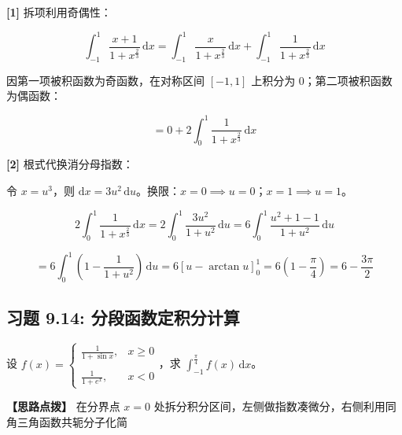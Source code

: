 \documentclass[11pt,a4paper,UTF8]{ctexart}
\begin{document}
\begin{solbox}[分步推导与答题规范]
\textbf{[1]} 拆项利用奇偶性：


\begin{equation*}
\int_{-1}^1 \frac{x+1}{1+x^{\frac{2}{3}}}\,\mathrm{d}x = \int_{-1}^1 \frac{x}{1+x^{\frac{2}{3}}}\,\mathrm{d}x + \int_{-1}^1 \frac{1}{1+x^{\frac{2}{3}}}\,\mathrm{d}x
\end{equation*}


因第一项被积函数为奇函数，在对称区间 $[-1, 1]$ 上积分为 0；第二项被积函数为偶函数：


\begin{equation*}
= 0 + 2\int_0^1 \frac{1}{1+x^{\frac{2}{3}}}\,\mathrm{d}x
\end{equation*}


\textbf{[2]} 根式代换消分母指数：

令 $x = u^3$，则 $\mathrm{d}x = 3u^2\,\mathrm{d}u$。换限：$x=0 \implies u=0$；$x=1 \implies u=1$。


\begin{equation*}
2\int_0^1 \frac{1}{1+x^{\frac{2}{3}}}\,\mathrm{d}x = 2\int_0^1 \frac{3u^2}{1+u^2}\,\mathrm{d}u = 6\int_0^1 \frac{u^2+1-1}{1+u^2}\,\mathrm{d}u
\end{equation*}



\begin{equation*}
= 6\int_0^1 \left(1 - \frac{1}{1+u^2}\right)\,\mathrm{d}u = 6\left[ u - \arctan u \right]_0^1 = 6\left(1 - \frac{\pi}{4}\right) = 6 - \frac{3\pi}{2}
\end{equation*}

\end{solbox}


\subsection{习题 9.14: 分段函数定积分计算}

设 $f(x) = \begin{cases} \frac{1}{1+\sin x}, & x \geqslant 0 \\ \\ \frac{1}{1+e^x}, & x < 0 \end{cases}$，求 $\int_{-1}^{\frac{\pi}{4}} f(x)\,\mathrm{d}x$。

\textbf{\color{DeepPurple}【思路点拨】} 在分界点 $x=0$ 处拆分积分区间，左侧做指数凑微分，右侧利用同角三角函数共轭分子化简
\end{document}
